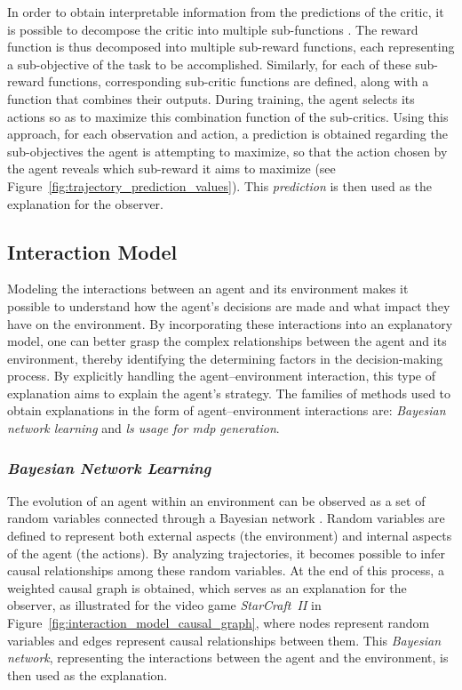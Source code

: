 In order to obtain interpretable information from the predictions of the critic, it is possible to decompose the critic into multiple sub-functions \parencite{juozapaitis2019explainable}.
The reward function is thus decomposed into multiple sub-reward functions, each representing a sub-objective of the task to be accomplished.
Similarly, for each of these sub-reward functions, corresponding sub-critic functions are defined, along with a function that combines their outputs.
During training, the agent selects its actions so as to maximize this combination function of the sub-critics.
Using this approach, for each observation and action, a prediction is obtained regarding the sub-objectives the agent is attempting to maximize, so that the action chosen by the agent reveals which sub-reward it aims to maximize (see Figure~\ref{fig:trajectory_prediction_values}).
This \textit{prediction} is then used as the explanation for the observer.



\subsection{Interaction Model}
\label{subsec:interaction_model}

Modeling the interactions between an agent and its environment makes it possible to understand how the agent's decisions are made and what impact they have on the environment.
By incorporating these interactions into an explanatory model, one can better grasp the complex relationships between the agent and its environment, thereby identifying the determining factors in the decision-making process.
By explicitly handling the agent--environment interaction, this type of explanation aims to explain the agent's strategy.
The families of methods used to obtain explanations in the form of agent--environment interactions are: \textit{Bayesian network learning} and \textit{\gls{ls} usage for \gls{mdp} generation}.

\subsubsection{\textit{Bayesian Network Learning}}
\label{subsubsec:bayesian_network_learning}

The evolution of an agent within an environment can be observed as a set of random variables connected through a Bayesian network \parencite{madumal2020explainable}.
Random variables are defined to represent both external aspects (the environment) and internal aspects of the agent (the actions).
By analyzing trajectories, it becomes possible to infer causal relationships among these random variables.
At the end of this process, a weighted causal graph is obtained, which serves as an explanation for the observer, as illustrated for the video game \textit{StarCraft~II} in Figure~\ref{fig:interaction_model_causal_graph}, where nodes represent random variables and edges represent causal relationships between them.
This \textit{Bayesian network}, representing the interactions between the agent and the environment, is then used as the explanation.


